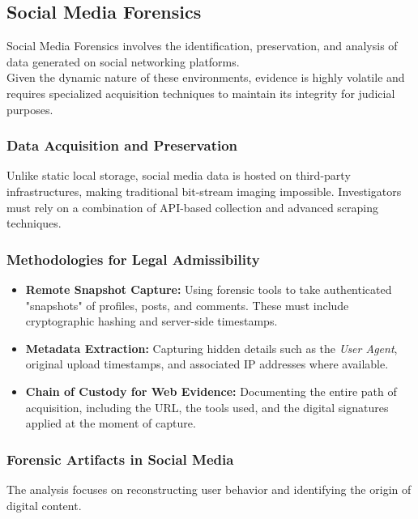 \subsection{Social Media Forensics}

Social Media Forensics involves the identification, preservation, and analysis of data generated on social networking platforms.\\
Given the dynamic nature of these environments, evidence is highly volatile and requires specialized acquisition techniques to maintain its integrity for judicial purposes.

\subsubsection{Data Acquisition and Preservation}
Unlike static local storage, social media data is hosted on third-party infrastructures, making traditional bit-stream imaging impossible. Investigators must rely on a combination of API-based collection and advanced scraping techniques.



\subsubsection*{Methodologies for Legal Admissibility}
\begin{itemize}
    \item \textbf{Remote Snapshot Capture:} Using forensic tools to take authenticated "snapshots" of profiles, posts, and comments. These must include cryptographic hashing and server-side timestamps.
    \item \textbf{Metadata Extraction:} Capturing hidden details such as the \textit{User Agent}, original upload timestamps, and associated IP addresses where available.
    \item \textbf{Chain of Custody for Web Evidence:} Documenting the entire path of acquisition, including the URL, the tools used, and the digital signatures applied at the moment of capture.
\end{itemize}

\subsubsection{Forensic Artifacts in Social Media}
The analysis focuses on reconstructing user behavior and identifying the origin of digital content.

